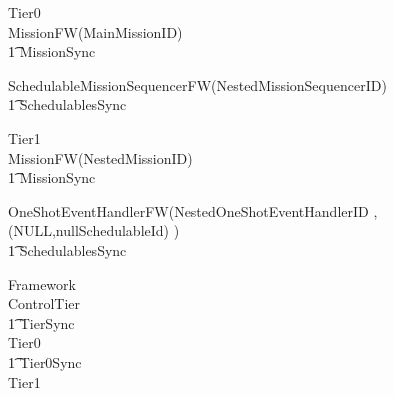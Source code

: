 \begin{circus}
\circprocess Tier0 \circdef \\

\circblockopen
	MissionFW(MainMissionID)\\
		\t1 	\lpar MissionSync \rpar \\
		\circblockopen









			SchedulableMissionSequencerFW(NestedMissionSequencerID)\\
\t1 \lpar SchedulablesSync \rpar\\



		\circblockclose
\circblockclose
\end{circus}
%
\begin{circus}
\circprocess Tier1 \circdef \\

\circblockopen
	MissionFW(NestedMissionID)\\
		\t1 	\lpar MissionSync \rpar \\
		\circblockopen












	OneShotEventHandlerFW(NestedOneShotEventHandlerID ,(NULL,nullSchedulableId)     )\\




\t1 \lpar SchedulablesSync \rpar\\




		\circblockclose
\circblockclose
\end{circus}
%
%
%
\begin{circus}
\circprocess Framework \circdef \\
\circblockopen
ControlTier \\
\t1 \lpar TierSync \rpar \\
 \circblockopen
Tier0
\\ \t1 \lpar Tier0Sync \rpar \\
Tier1
\circblockclose
\circblockclose
\end{circus}
%
%
